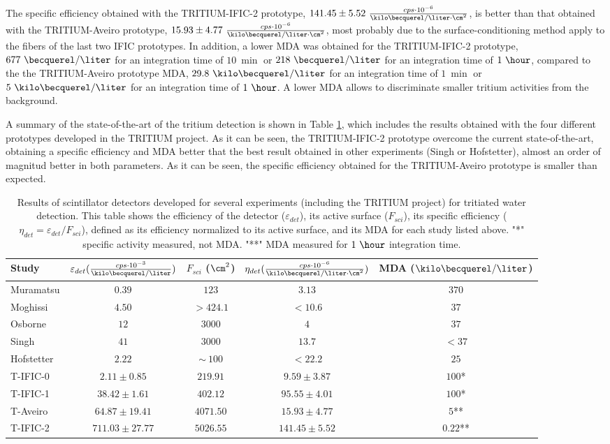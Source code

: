 \begin{enumerate}
\begin{itemize}
The specific efficiency obtained with the TRITIUM-IFIC-2 prototype, $141.45 \pm 5.52~\frac{cps \cdot{} 10^{-6}}{\kilo\becquerel/ \liter \cdot{} \cm^2}$, is better than that obtained with the TRITIUM-Aveiro prototype, $15.93 \pm 4.77~\frac{cps \cdot{} 10^{-6}}{\kilo\becquerel/ \liter \cdot{} \cm^2}$, most probably due to the surface-conditioning method apply to the fibers of the last two IFIC prototypes. In addition, a lower MDA was obtained for the TRITIUM-IFIC-2 prototype, $677~\becquerel/\liter$ for an integration time of $10~\min$ or $218~\becquerel/\liter$ for an integration time of $1~\hour$, compared to the the TRITIUM-Aveiro prototype MDA, $29.8~\kilo\becquerel/\liter$ for an integration time of $1~\min$ or $5~\kilo\becquerel/\liter$ for an integration time of $1~\hour$. A lower MDA allows to discriminate smaller tritium activities from the background.

A summary of the state-of-the-art of the tritium detection is shown in Table \ref{tab:ComparisonResultsTritium}, which includes the results obtained with the four different prototypes developed in the TRITIUM project. As it can be seen, the TRITIUM-IFIC-2 prototype overcome the current state-of-the-art, obtaining a specific efficiency and MDA better that the best result obtained in other experiments (Singh or Hofstetter), almost an order of magnitud better in both parameters. As it can be seen, the specific efficiency obtained for the TRITIUM-Aveiro prototype is smaller than expected. 

\begin{table}[htbp]
\centering{}%
\begin{tabular}{lcccc}
\toprule 
Study & \parbox{5.5em}{$\varepsilon_{det}(\frac{cps \cdot{} 10^{-3}}{\kilo\becquerel/\liter})$}  & \parbox{4.5em}{$F_{sci}$ ($\cm^2$)}  & \parbox{6.5em}{$\eta_{det}(\frac{cps \cdot{} 10^{-6}}{\kilo\becquerel/ \liter \cdot{} \cm^2})$} & MDA ($\kilo\becquerel / \liter$) \tabularnewline
\midrule
\midrule 
Muramatsu & $0.39$ & $123$ & $3.13$ & $370$ \tabularnewline
Moghissi & $4.50$ & $>424.1$ & $<10.6$ & $37$ \tabularnewline
Osborne & $12$ & $3000$ & $4$ & $37$ \tabularnewline
Singh & $41$ & $3000$ & $13.7$ & $<37$ \tabularnewline
Hofstetter & $2.22$ & $\sim~100$ & $<22.2$ & $25$ \tabularnewline
T-IFIC-0 & $2.11 \pm 0.85$ & $219.91$ & $9.59 \pm 3.87$ & $100$* \tabularnewline
T-IFIC-1 & $38.42 \pm 1.61$ & $402.12$ & $95.55 \pm 4.01$ & $100$* \tabularnewline
T-Aveiro & $64.87 \pm 19.41$ & $4071.50$ & $15.93 \pm 4.77$ & $5$** \tabularnewline
T-IFIC-2 & $711.03 \pm 27.77$ & $5026.55$ & $141.45 \pm 5.52$ & $0.22$** \tabularnewline
\bottomrule
\end{tabular}
\caption{Results of scintillator detectors developed for several experiments (including the TRITIUM project) for tritiated water detection. This table shows the efficiency of the detector ($\varepsilon_{det}$), its active surface ($F_{sci}$), its specific efficiency ($\eta_{det}=\varepsilon_{det}/F_{sci}$), defined as its efficiency normalized to its active surface, and its MDA for each study listed above. "*" specific activity measured, not MDA. "**" MDA measured for $1~\hour$ integration time.}
\label{tab:ComparisonResultsTritium}
\end{table}


\end{itemize}
\end{enumerate}
